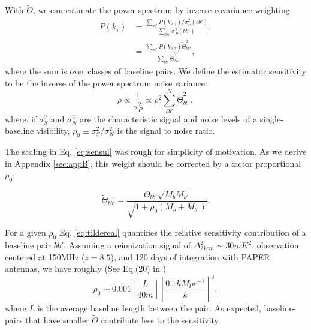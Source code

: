 \documentclass[twocolumn,apj,numberedappendix]{emulateapj}
\renewcommand\[{\begin{equation}}
\renewcommand\]{\end{equation}}
\begin{document}
With $\widetilde{\Theta}$, we can estimate the power spectrum by inverse covariance weighting:
\begin{equation}
\begin{aligned}
 P(k_{\tau}) &= \frac{\sum_{bb'}P(k_{b,\tau})/\sigma_P^2(bb')}{\sum_{bb'}\sigma_P^2(bb')}, \\
 &= \frac{\sum_{bb'}P(k_{b,\tau})\widetilde{\Theta}_{bb'}^2}{\sum_{bb'}\widetilde{\Theta}_{bb'}^2},
 \end{aligned}
\end{equation}
where the sum is over classes of baseline pairs. 
We define the estimator sensitivity to be the inverse of the power spectrum noise variance:
\begin{equation}
\rho \propto \frac{1}{\sigma_P^2} \propto \rho_0^2\sum_{bb'}^N\widetilde{\Theta}^2_{bb'},
\end{equation}
where, if $\sigma_S^2$ and $\sigma_N^2$ are the characteristic signal and noise levels of a single-baseline visibility, $\rho_0\equiv\sigma_S^2/\sigma_N^2$ is the signal to noise ratio. 


The scaling in Eq. \eqref{eq:sensul} was rough for simplicity of motivation. As we derive in Appendix \ref{sec:appB}, this weight should be corrected by a factor proportional $\rho_0$:

\begin{equation}
\label{eq:tildereal}
\widetilde{\Theta}_{bb'}=\frac{\Theta_{bb'}\sqrt{M_bM_{b'}}}{\sqrt{1 + \rho_0 \left(M_b+M_{b'} \right)}}.
\end{equation}

For a given $\rho_0$ Eq. \eqref{eq:tildereal} quantifies the relative sensitivity contribution of a baseline pair $bb'$. Assuming a reionization signal of $\Delta_{21cm}^2\sim 30mK^2$, observation centered at 150MHz ($z=8.5$), and 120 days of integration with PAPER antennas, we have roughly
(See Eq.(20) in \cite{first-paper})
\begin{equation}
\rho_0 \sim 0.001\left[\frac{L}{40m}\right] \left[\frac{0.1hMpc^{-1}}{k}\right]^3, 
\end{equation}
where $L$ is the average baseline length between the pair. As expected, baseline-pairs that have smaller $\widetilde{\Theta}$ contribute less to the sensitivity. 
\end{document}
